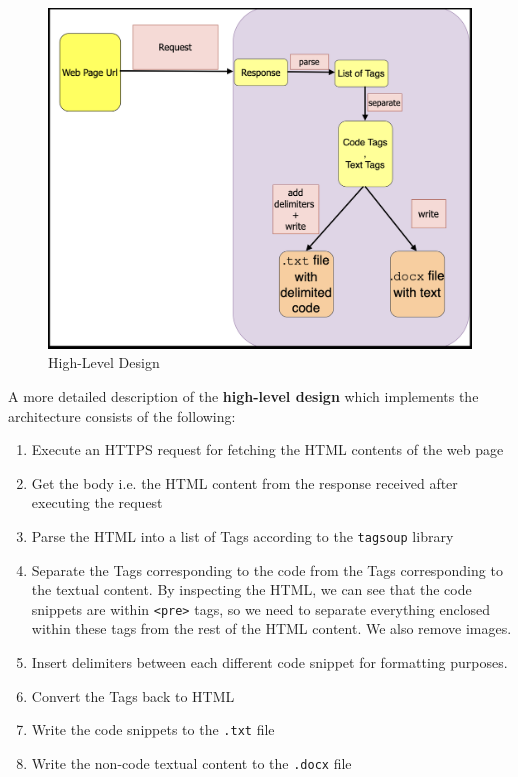 \documentclass{scrreprt}
\newcommand{\ttt}[1]{\texttt{#1}}
\begin{document}
\begin{figure}[h]
    \centering
    \includegraphics[width=1.0\textwidth]{figures/new-high-design.png}
    \caption{High-Level Design}
    \label{fig:high-level-design}
\end{figure}

A more detailed description of the \textbf{high-level design} which implements the architecture consists of the following:
\begin{enumerate}
    \item Execute an HTTPS request for fetching the HTML contents of the web page
    \item Get the body i.e. the HTML content from the response received after executing the request
    \item Parse the HTML into a list of Tags according to the \texttt{tagsoup} library
    \item Separate the Tags corresponding to the code from the Tags corresponding to the textual content. By inspecting the HTML, we can see that the code snippets are within \texttt{<pre>} tags, so we need to separate everything enclosed within these tags from the rest of the HTML content. We also remove images. 
    \item Insert delimiters between each different code snippet for formatting purposes. 
    \item Convert the Tags back to HTML
    \item Write the code snippets to the \ttt{.txt} file
    \item Write the non-code textual content to the \ttt{.docx} file
\end{enumerate}
\end{document}
